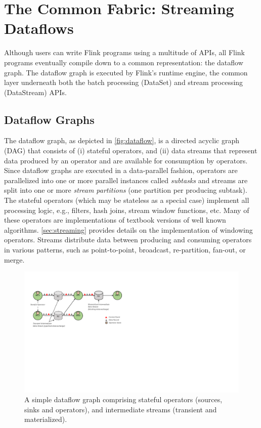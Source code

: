 
\section{The Common Fabric: Streaming Dataflows}
\label{sec:execution}

Although users can write Flink programs using a multitude of APIs, all Flink programs eventually compile down to a common representation: the dataflow graph. The dataflow graph is executed by Flink's runtime engine, the common layer underneath both the batch processing (DataSet) and stream processing (DataStream) APIs.


\subsection{Dataflow Graphs}
The dataflow graph, as depicted in \autoref{fig:dataflow}, is a directed acyclic graph (DAG) that consists of (i) stateful operators, and (ii) data streams that represent data produced by an operator and are available for consumption by operators. Since dataflow graphs are executed in a data-parallel fashion, operators are parallelized into one or more parallel instances called \emph{subtasks} and streams are split into one or more \emph{stream partitions} (one partition per producing subtask). 
The stateful operators (which may be stateless as a special case) implement all processing logic, e.g., filters, hash joins, stream window functions, etc. Many of these operators are implementations of textbook versions of well known algorithms. \autoref{sec:streaming} provides details on the implementation of windowing operators. Streams distribute data between producing and consuming operators in various patterns, such as point-to-point, broadcast, re-partition, fan-out, or merge.


\begin{figure}[t!]
\centering
\includegraphics[width=.7\textwidth]{figs/dataflow}
\vspace{-3mm}
\caption{A simple dataflow graph comprising stateful operators (sources, sinks and operators), and intermediate streams (transient and materialized).}
\label{fig:dataflow}
\end{figure}




